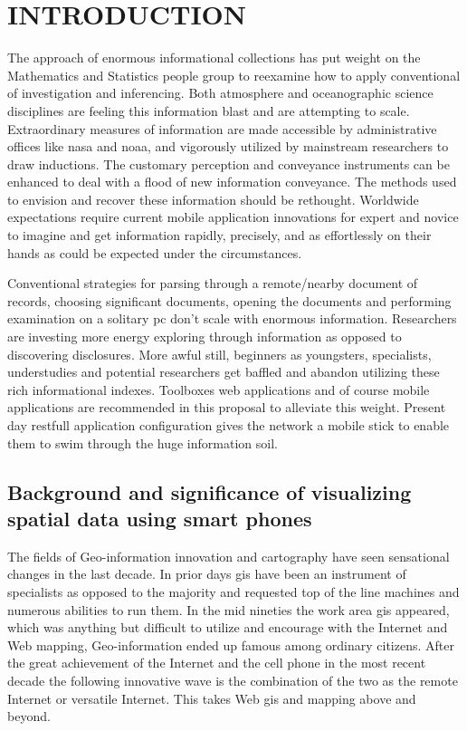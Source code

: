 \chapter{INTRODUCTION}
\label{chap:intro}


The approach of enormous informational collections has put weight on the Mathematics and Statistics people group to reexamine how to apply conventional of investigation and inferencing. Both atmosphere and oceanographic science disciplines are feeling this information blast and are attempting to scale. Extraordinary measures of information are made accessible by administrative offices like \gls{nasa} and \gls{noaa}, and vigorously utilized by mainstream researchers to draw inductions. The customary perception and conveyance instruments can be enhanced to deal with a flood of new information conveyance. The methods used to envision and recover these information should be rethought. Worldwide expectations require current mobile application innovations for expert and novice to imagine and get information rapidly, precisely, and as effortlessly on their hands as could be expected under the circumstances.

Conventional strategies for parsing through a remote/nearby document of records, choosing significant documents, opening the documents and performing examination on a solitary \gls{pc} don't scale with enormous information. Researchers are investing more energy exploring through information as opposed to discovering disclosures. More awful still, beginners as youngsters, specialists, understudies and potential researchers get baffled and abandon utilizing these rich informational indexes. Toolboxes web applications and of course mobile applications are recommended in this proposal to alleviate this weight. Present day \gls{restfull} application configuration gives the network a mobile stick to enable them to swim through the huge information soil.


\section{Background and significance of visualizing spatial data using smart phones}

The fields of Geo-information innovation and cartography have seen sensational changes in the last decade. In prior days \gls{gis} have been an instrument of specialists as opposed to the majority and requested top of the line machines and numerous abilities to run them. In the mid nineties the work area \gls{gis} appeared, which was anything but difficult to utilize and encourage with the Internet and Web mapping, Geo-information ended up famous among ordinary citizens. After the great achievement of the Internet and the cell phone in the most recent decade the following innovative wave is the combination of the two as the remote Internet or versatile Internet. This takes Web \gls{gis} and mapping above and beyond. 

